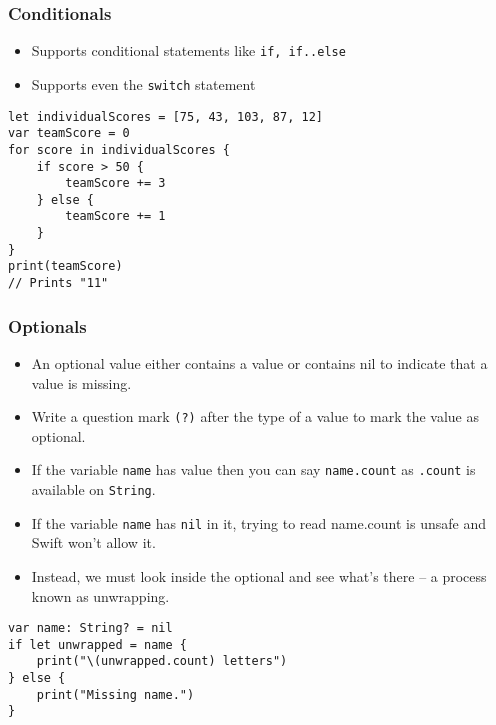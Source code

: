 \begin{frame}[fragile] \frametitle{Conditionals}

\begin{itemize}
\item Supports conditional statements like \lstinline|if, if..else|
\item Supports even the \lstinline|switch| statement
\end{itemize}

\begin{lstlisting}[basicstyle=\scriptsize]
let individualScores = [75, 43, 103, 87, 12]
var teamScore = 0
for score in individualScores {
    if score > 50 {
        teamScore += 3
    } else {
        teamScore += 1
    }
}
print(teamScore)
// Prints "11"
\end{lstlisting}
\end{frame}

\begin{frame}[fragile] \frametitle{Optionals}

\begin{itemize}
\item An optional value either contains a value or contains nil to indicate that a value is missing. 
\item Write a question mark \lstinline|(?)| after the type of a value to mark the value as optional.
\item If the variable \lstinline|name| has value then you can say \lstinline|name.count| as \lstinline|.count| is available on \lstinline|String|.
\item If the variable \lstinline|name| has \lstinline|nil| in it, trying to read name.count is unsafe and Swift won’t allow it. 
\item Instead, we must look inside the optional and see what’s there – a process known as unwrapping.
\end{itemize}

\begin{lstlisting}[basicstyle=\scriptsize]
var name: String? = nil
if let unwrapped = name {
    print("\(unwrapped.count) letters")
} else {
    print("Missing name.")
}
\end{lstlisting}

\end{frame}

